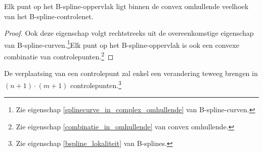 \documentclass[computergesteund_ontwerp_van_curven_en_oppervlakken.tex]{subfiles}
\begin{document}
\begin{ei}
Elk punt op het B-spline-oppervlak ligt binnen de convex omhullende veelhoek van het B-spline-controlenet.
\begin{proof}
Ook deze eigenschap volgt rechtstreeks uit de overeenkomstige eigenschap van B-spline-curven.\footnote{Zie eigenschap \ref{splinecurve_in_complex_omhullende} van B-spline-curven.}Elk punt op het B-spline-oppervlak is ook een convexe combinatie van controlepunten.\footnote{Zie eigenschap \ref{combinatie_in_omhullende} van convex omhullende.}
\end{proof}
\end{ei}

\begin{ei}
De verplaatsing van een controlepunt zal enkel een verandering teweeg brengen in $(n+1)\cdot(m+1)$ controlepunten.\footnote{Zie eigenschap \ref{bspline_lokaliteit} van B-splines.}
\end{ei}
\end{document}
